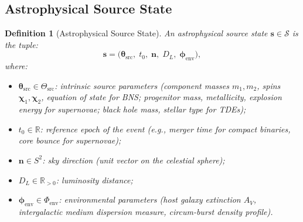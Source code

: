 \documentclass[11pt,a4paper]{article}
\newtheorem{definition}[theorem]{Definition}
\theoremstyle{definition}
\newcommand{\R}{\mathbb{R}}
\newcommand{\cS}{\mathcal{S}}
\begin{document}
\subsection{Astrophysical Source State}
\begin{definition}[Astrophysical Source State]\label{def:source_state}
An astrophysical source state $\mathbf{s} \in \cS$ is the tuple:
\begin{equation}\label{eq:source_state}
\mathbf{s} = \bigl( \boldsymbol{\theta}_{\mathrm{src}}, \; t_0, \; \mathbf{n}, \; D_L, \; \boldsymbol{\phi}_{\mathrm{env}} \bigr),
\end{equation}
where:
\begin{itemize}
    \item $\boldsymbol{\theta}_{\mathrm{src}} \in \Theta_{\mathrm{src}}$: intrinsic source parameters (component masses $m_1, m_2$, spins $\boldsymbol{\chi}_1, \boldsymbol{\chi}_2$, equation of state for BNS; progenitor mass, metallicity, explosion energy for supernovae; black hole mass, stellar type for TDEs);
    \item $t_0 \in \R$: reference epoch of the event (e.g., merger time for compact binaries, core bounce for supernovae);
    \item $\mathbf{n} \in S^2$: sky direction (unit vector on the celestial sphere);
    \item $D_L \in \R_{>0}$: luminosity distance;
    \item $\boldsymbol{\phi}_{\mathrm{env}} \in \Phi_{\mathrm{env}}$: environmental parameters (host galaxy extinction $A_V$, intergalactic medium dispersion measure, circum-burst density profile).
\end{itemize}
\end{definition}
\end{document}
